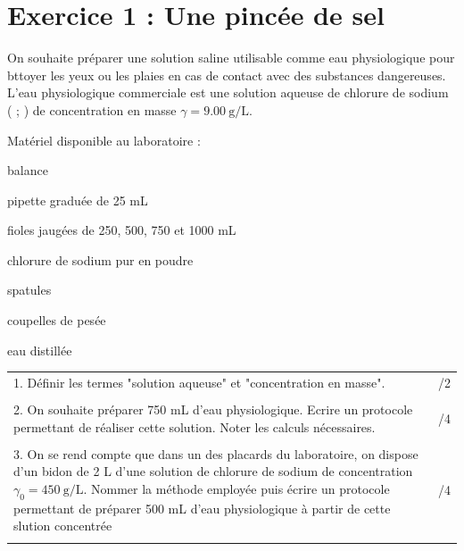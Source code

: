 \documentclass[a4paper,12pt]{article}
\begin{document}
\section*{Exercice 1 : Une pincée de sel}
\begin{minipage}{.48\linewidth}
    On souhaite préparer une solution saline utilisable comme eau physiologique pour bttoyer les yeux ou les plaies en cas de contact avec des substances dangereuses.\\
L'eau physiologique commerciale est une solution aqueuse de chlorure de sodium ( ; ) de concentration en masse $\gamma = \SI{9,00}{\gram\per\liter}$.
\end{minipage}\hspace{.02\linewidth}
\begin{minipage}{.5\linewidth}
    Matériel disponible au laboratoire :
    \begin{itemize*}
        \item balance
        \item pipette graduée de 25 mL
        \item fioles jaugées de 250, 500, 750 et 1000 mL
        \item chlorure de sodium pur en poudre
        \item spatules
        \item coupelles de pesée
        \item eau distillée
    \end{itemize*}
\end{minipage}

\begin{tabular}{m{.9\linewidth}|m{.1\linewidth}}
    1. Définir les termes "solution aqueuse" et "concentration en masse". & /2\\
    \rule{0pt}{2cm} & \\
    2. On souhaite préparer 750 mL d'eau physiologique. Ecrire un protocole permettant de réaliser cette solution. Noter les calculs nécessaires. & /4\\
    \rule{0pt}{4cm} & \\
    3. On se rend compte que dans un des placards du laboratoire, on dispose d'un bidon de 2 L d'une solution de chlorure de sodium de concentration $\gamma_0 = \SI{450}{\gram\per\liter}$. Nommer la méthode employée puis écrire un protocole permettant de préparer 500 mL d'eau physiologique à partir de cette slution concentrée & /4\\
    \rule{0pt}{4cm} & \\
\end{tabular}
\end{document}
